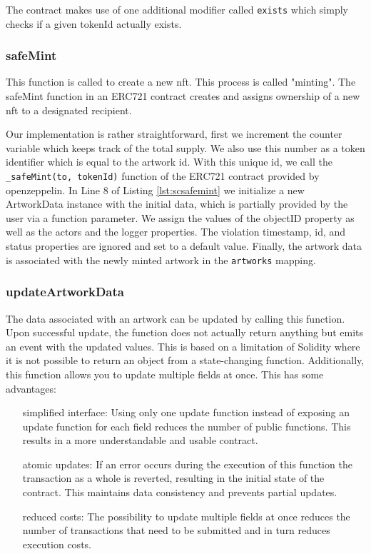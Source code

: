 The contract makes use of one additional modifier called \texttt{exists} which simply checks if a given tokenId actually exists.

\subsubsection{safeMint}
This function is called to create a new \gls{nft}. This process is called "minting". The safeMint function in an ERC721 contract creates and assigns ownership of a new \gls{nft} to a designated recipient. 



Our implementation is rather straightforward, first we increment the counter variable which keeps track of the total supply. We also use this number as a token identifier which is equal to the artwork id. With this unique id, we call the \texttt{\_safeMint(to, tokenId)} function of the ERC721 contract provided by openzeppelin. In Line 8 of Listing \ref{lst:scsafemint} we initialize a new ArtworkData instance with the initial data, which is partially provided by the user via a function parameter. We assign the values of the objectID property as well as the actors and the logger properties. The violation timestamp, id, and status properties are ignored and set to a default value. Finally, the artwork data is associated with the newly minted artwork in the \texttt{artworks} mapping.

\subsubsection{updateArtworkData}
The data associated with an artwork can be updated by calling this function. Upon successful update, the function does not actually return anything but emits an event with the updated values. This is based on a limitation of Solidity where it is not possible to return an object from a state-changing function. Additionally, this function allows you to update multiple fields at once. This has some advantages:

\begin{itemize}[align=left, font=\itshape]
    \item[simplified interface:] Using only one update function instead of exposing an update function for each field reduces the number of public functions. This results in a more understandable and usable contract.
    \item[atomic updates:] If an error occurs during the execution of this function the transaction as a whole is reverted, resulting in the initial state of the contract. This maintains data consistency and prevents partial updates.
    \item[reduced costs:] The possibility to update multiple fields at once reduces the number of transactions that need to be submitted and in turn reduces execution costs.
\end{itemize}

